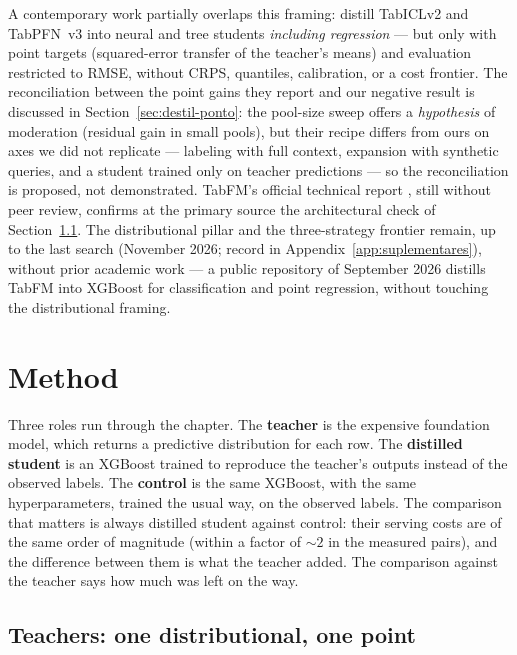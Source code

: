 A contemporary work partially overlaps this framing:
\citet{jeong2026} distill TabICLv2 and TabPFN~v3 into neural and
tree students \emph{including regression} --- but only with point
targets (squared-error transfer of the teacher's means) and
evaluation restricted to RMSE, without CRPS, quantiles, calibration,
or a cost frontier. The reconciliation between the point gains they
report and our negative result is discussed in
Section~\ref{sec:destil-ponto}: the pool-size sweep offers a
\emph{hypothesis} of moderation (residual gain in small pools), but
their recipe differs from ours on axes we did not replicate ---
labeling with full context, expansion with synthetic queries, and a
student trained only on teacher predictions --- so the
reconciliation is proposed, not demonstrated. TabFM's official
technical report \citep{kong2026}, still without peer review,
confirms at the primary source the architectural check of
Section~\ref{sec:destil-professores}. The distributional pillar and
the three-strategy frontier remain, up to the last search (November
2026; record in Appendix~\ref{app:suplementares}), without prior
academic work --- a public repository of September 2026 distills
TabFM into XGBoost for classification and point regression, without
touching the distributional framing.

\section{Method}
\label{sec:destil-metodo}

Three roles run through the chapter. The \textbf{teacher} is the
expensive foundation model, which returns a predictive distribution
for each row. The \textbf{distilled student} is an XGBoost trained
to reproduce the teacher's outputs instead of the observed labels.
The \textbf{control} is the same XGBoost, with the same
hyperparameters, trained the usual way, on the observed labels. The
comparison that matters is always distilled student against control:
their serving costs are of the same order of magnitude (within a
factor of ${\sim}2$ in the measured pairs), and the difference
between them is what the teacher added. The comparison against the teacher says how
much was left on the way.

\subsection{Teachers: one distributional, one point}
\label{sec:destil-professores}

